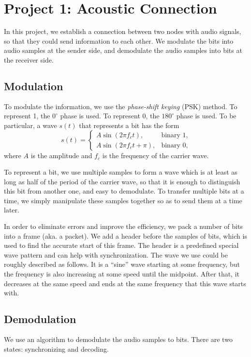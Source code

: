 \documentclass[11pt, conference]{IEEEtran}
\begin{document}
\section{Project 1: Acoustic Connection}

In this project, we establish a connection between two nodes with audio signals, so that they could send information to each other. We modulate the bits into audio samples at the sender side, and demodulate the audio samples into bits at the receiver side.

\subsection{Modulation}

To modulate the information, we use the \emph{phase-shift keying} (PSK) method. To represent 1, the $0^\circ$ phase is used. To represent 0, the $180^\circ$ phase is used. To be particular, a wave $s(t)$ that represents a bit has the form
\[
s(t) =
\begin{cases}
A\sin(2\pi f_ct), & \text{binary 1}, \\
A\sin(2\pi f_ct + \pi), & \text{binary 0},
\end{cases}
\]
where $A$ is the amplitude and $f_c$ is the frequency of the carrier wave.

To represent a bit, we use multiple samples to form a wave which is at least as long as half of the period of the carrier wave, so that it is enough to distinguish this bit from another one, and easy to demodulate. To transfer multiple bits at a time, we simply manipulate these samples together so as to send them at a time later.

In order to eliminate errors and improve the efficiency, we pack a number of bits into a frame (aka. a packet). We add a header before the samples of bits, which is used to find the accurate start of this frame. The header is a predefined special wave pattern and can help with synchronization. The wave we use could be roughly described as follows. It is a ``sine'' wave starting at some frequency, but the frequency is also increasing at some speed until the midpoint. After that, it decreases at the same speed and ends at the same frequency that this wave starts with.

\subsection{Demodulation}

We use an algorithm to demodulate the audio samples to bits. There are two states: synchronizing and decoding.
\end{document}
